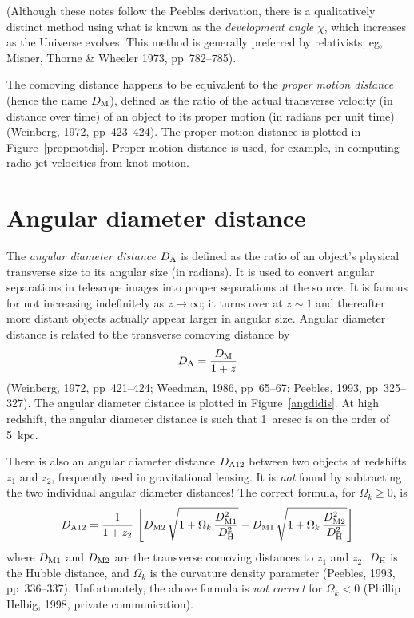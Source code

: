 (Although these notes follow the Peebles derivation, there is a
qualitatively distinct method using what is known as the {\em
development angle\/} $\chi$, which increases as the Universe evolves.
This method is generally preferred by relativists; eg, Misner, Thorne
\& Wheeler 1973, pp~782--785).

The comoving distance happens to be equivalent to the {\em proper
motion distance\/} (hence the name $D_{\rm M}$), defined as the ratio
of the actual transverse velocity (in distance over time) of an object
to its proper motion (in radians per unit time) (Weinberg, 1972,
pp~423--424).  The proper motion distance is plotted in
Figure~\ref{propmotdis}.  Proper motion distance is used, for example,
in computing radio jet velocities from knot motion.


\section{Angular diameter distance}

The {\em angular diameter distance\/} $D_{\rm A}$ is defined as the
ratio of an object's physical transverse size to its angular size (in
radians).  It is used to convert angular separations in telescope
images into proper separations at the source.  It is famous for not
increasing indefinitely as $z\rightarrow\infty$; it turns over at
$z\sim 1$ and thereafter more distant objects actually appear larger
in angular size.  Angular diameter distance is related to the
transverse comoving distance by
\begin{equation}
D_{\rm A} = \frac{D_{\rm M}}{1+z}
\end{equation}
(Weinberg, 1972, pp~421--424; Weedman, 1986, pp~65--67; Peebles, 1993,
pp~325--327).  The angular diameter distance is plotted in
Figure~\ref{angdidis}.  At high redshift, the angular diameter
distance is such that 1~arcsec is on the order of 5~kpc.

There is also an angular diameter distance $D_{\rm A12}$ between two
objects at redshifts $z_1$ and $z_2$, frequently used in gravitational
lensing.  It is {\em not\/} found by subtracting the two individual
angular diameter distances!  The correct formula, for $\Omega_k\geq
0$, is
\begin{equation}
D_{\rm A12}= \frac{1}{1+z_2}\,\left[
 D_{\rm M2}\,\sqrt{1+\Omega_k\,\frac{D_{\rm M1}^2}{D_{\rm H}^2}}
 - D_{\rm M1}\,\sqrt{1+\Omega_k\,\frac{D_{\rm M2}^2}{D_{\rm H}^2}}\right]
\end{equation}
where $D_{\rm M1}$ and $D_{\rm M2}$ are the transverse comoving
distances to $z_1$ and $z_2$, $D_{\rm H}$ is the Hubble distance, and
$\Omega_k$ is the curvature density parameter (Peebles, 1993,
pp~336--337).  Unfortunately, the above formula is {\em not correct\/}
for $\Omega_k<0$ (Phillip Helbig, 1998, private communication).


